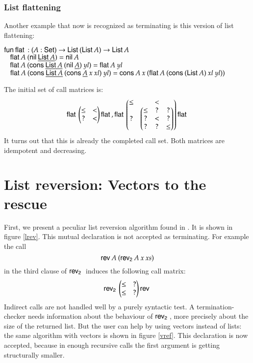 \subsubsection{List flattening}
Another example that now is recognized as terminating is this version of list flattening:
\begin{bsp}
$\mathsf{fun}\: \mathsf{flat}\: : (A : \mathsf{Set} ) \rightarrow \mathsf{List}\: (\mathsf{List}\: A) \rightarrow \mathsf{List}\: A$\\
$\hspace*{3mm} \mathsf{flat}\: A \: (\mathsf{nil}\: \underline{\mathsf{List}\: A}) = \mathsf{nil}\: A $\\
$\hspace*{3mm} \mathsf{flat}\: A \: (\mathsf{cons}\: \underline{\mathsf{List}\: A} \: (\mathsf{nil}\: \underline{A}) \: yl) = \mathsf{flat}\: A \: yl $\\
$\hspace*{3mm} \mathsf{flat}\: A \: (\mathsf{cons}\: \underline{\mathsf{List}\: A} \: (\mathsf{cons}\: \underline{A} \: x \: xl) \: yl)  = \mathsf{cons}\: A \: x \: (\mathsf{flat}\: A \: (\mathsf{cons}\: (\mathsf{List}\: A) \: xl \: yl))$
\end{bsp}
\noindent The initial set of call matrices is:
\[
\mathsf{flat}\: \begin{pmatrix}
\leq & < \\
?    & < 
\end{pmatrix}\mathsf{flat}\:
, 
\mathsf{flat}\: \begin{pmatrix}
\leq & < \\
?    & 
\begin{pmatrix}
\leq &  ?  & ? \\
?    &  <  & ? \\
?    &  ?  & \leq 
\end{pmatrix}
\end{pmatrix}\mathsf{flat}\:
\] 
It turns out that this is already the completed call set.
Both matrices are idempotent and decreasing.

\section{List reversion: Vectors to the rescue}
First, we present a peculiar list reversion algorithm found in \cite{blanqui04typebased}.
It is shown in figure \ref{lrev}. This mutual declaration is not accepted as terminating. 
For example the call 
\[\mathsf{rev}\: A \: (\mathsf{rev_2}\: A \: x \: xs)\]
in the third clause of $\mathsf{rev_2}\:$ induces the following call matrix:
\[
\mathsf{rev_2}\: \begin{pmatrix}
\leq & ? \\
\leq & ?  
\end{pmatrix}\mathsf{rev}\:
\] 
Indirect calls are not handled well by a purely syntactic test.
A termination-checker needs information about the behaviour of $\mathsf{rev_2}\:$, more precisely 
about the size of the returned list.
But the user can help by using vectors instead of lists: the same algorithm with vectors is shown in figure \ref{vref}. 
This declaration is now accepted, because in enough recursive calls the first argument is getting structurally smaller.

